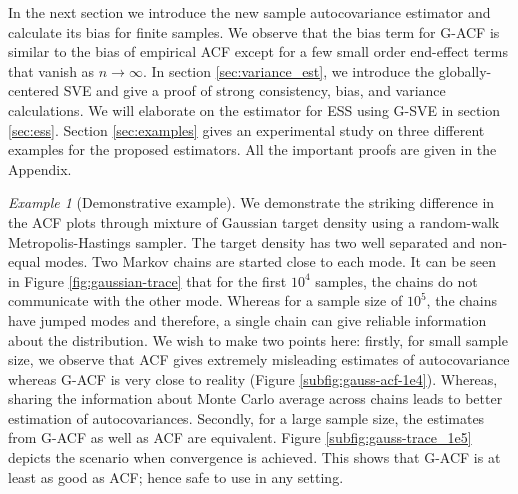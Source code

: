 \documentclass[11pt]{article}
\theoremstyle{remark}
\newtheorem{example}{Example}
\begin{document}
In the next section we introduce the new sample autocovariance estimator and calculate its bias for finite samples. We observe that the bias term for G-ACF is similar to the bias of empirical ACF except for a few small order end-effect terms that vanish as $n \to \infty$. In section \ref{sec:variance_est}, we introduce the globally-centered SVE and give a proof of strong consistency, bias, and variance calculations. We will elaborate on the estimator for ESS using G-SVE in section \ref{sec:ess}. Section \ref{sec:examples} gives an experimental study on three different examples for the proposed estimators. All the important proofs are given in the Appendix. 

\begin{example}[Demonstrative example]

We demonstrate the striking difference in the ACF plots through mixture of Gaussian target density using a random-walk Metropolis-Hastings sampler. The target density has two well separated and non-equal modes. Two Markov chains are started close to each mode. It can be seen in Figure \ref{fig:gaussian-trace} that for the first $10^4$ samples, the chains do not communicate with the other mode. Whereas for a sample size of $10^5$, the chains have jumped modes and therefore, a single chain can give reliable information about the distribution. We wish to make two points here: firstly, for small sample size, we observe that ACF gives extremely misleading estimates of autocovariance whereas G-ACF is very close to reality (Figure \ref{subfig:gauss-acf-1e4}). Whereas, sharing the information about Monte Carlo average across chains leads to better estimation of autocovariances. Secondly, for a large sample size, the estimates from G-ACF as well as ACF are equivalent. Figure \ref{subfig:gauss-trace_1e5} depicts the scenario when convergence is achieved. This shows that G-ACF is at least as good as ACF; hence safe to use in any setting.


\end{example}
\end{document}
